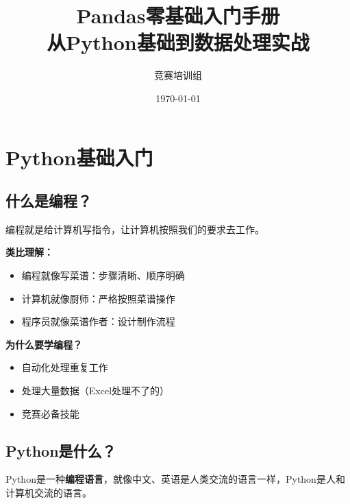 \documentclass[12pt,a4paper]{article}
\title{\textbf{Pandas零基础入门手册}\\[0.5em]\large 从Python基础到数据处理实战}
\author{竞赛培训组}
\date{\today}
\begin{document}
\maketitle
\tableofcontents
\newpage

\section{Python基础入门}

\subsection{什么是编程？}

\begin{knowledgebox}
编程就是给计算机写指令，让计算机按照我们的要求去工作。

\textbf{类比理解：}
\begin{itemize}
    \item 编程就像写菜谱：步骤清晰、顺序明确
    \item 计算机就像厨师：严格按照菜谱操作
    \item 程序员就像菜谱作者：设计制作流程
\end{itemize}

\textbf{为什么要学编程？}
\begin{itemize}
    \item 自动化处理重复工作
    \item 处理大量数据（Excel处理不了的）
    \item 竞赛必备技能
\end{itemize}
\end{knowledgebox}

\subsection{Python是什么？}

Python是一种\textbf{编程语言}，就像中文、英语是人类交流的语言一样，Python是人和计算机交流的语言。
\end{document}
